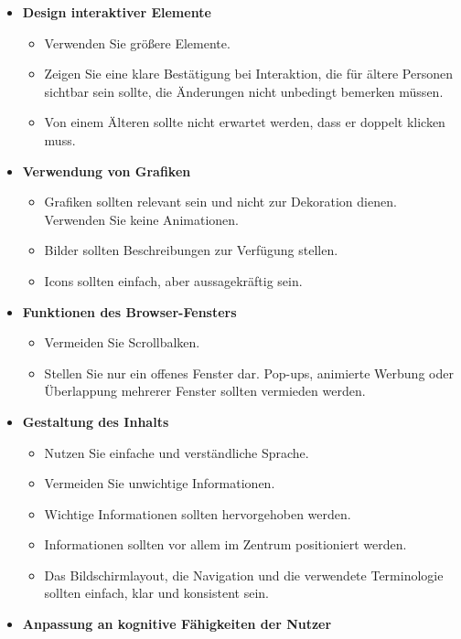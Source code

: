\begin{table}[p]
	\begin{itemize}[label={}]
		\item \textbf{Design interaktiver Elemente}
		\begin{itemize}[nosep]
			\item Verwenden Sie größere Elemente.
			\item Zeigen Sie eine klare Bestätigung bei Interaktion, die für ältere Personen sichtbar sein sollte, die Änderungen nicht unbedingt bemerken müssen.
			\item Von einem Älteren sollte nicht erwartet werden, dass er doppelt klicken muss.
		\end{itemize}
			\item \textbf{Verwendung von Grafiken}
		\begin{itemize}[nosep]
			\item Grafiken sollten relevant sein und nicht zur Dekoration dienen. Verwenden Sie keine Animationen.
			\item Bilder sollten Beschreibungen zur Verfügung stellen.
			\item Icons sollten einfach, aber aussagekräftig sein.
		\end{itemize}
			\item \textbf{Funktionen des Browser-Fensters}
		\begin{itemize}[nosep]
			\item Vermeiden Sie Scrollbalken.
			\item Stellen Sie nur ein offenes Fenster dar. Pop-ups, animierte Werbung oder Überlappung mehrerer Fenster sollten vermieden werden.
		\end{itemize}
			\item \textbf{Gestaltung des Inhalts}
		\begin{itemize}[nosep]
			\item Nutzen Sie einfache und verständliche Sprache.
			\item Vermeiden Sie unwichtige Informationen.
			\item Wichtige Informationen sollten hervorgehoben werden.
			\item Informationen sollten vor allem im Zentrum positioniert werden.
			\item Das Bildschirmlayout, die Navigation und die verwendete Terminologie sollten einfach, klar und konsistent sein.
		\end{itemize}
			\item \textbf{Anpassung an kognitive Fähigkeiten der Nutzer}

\end{itemize}
\end{table}
